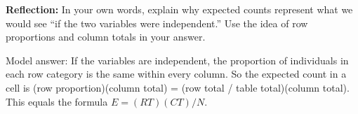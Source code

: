 \documentclass[10pt]{article}
\begin{document}
\begin{reflectionbox}
\textbf{Reflection:} In your own words, explain why expected counts represent what we
would see ``if the two variables were independent.'' Use the idea of row proportions
and column totals in your answer.

\begin{teachernote}
    Model answer: If the variables are independent, the proportion of individuals in
    each row category is the same within every column. So the expected count in a cell
    is (row proportion)(column total) = (row total / table total)(column total). This
    equals the formula $E = (RT)(CT)/N$.
\end{teachernote}
\end{reflectionbox}
\end{document}
